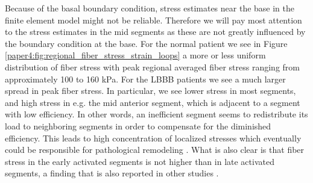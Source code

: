 Because of the basal boundary condition, stress estimates near the
base in the finite element model might not be reliable. Therefore we
will pay most attention to the stress 
estimates in the mid segments as these are not greatly influenced by
the boundary condition at the base. For the normal patient we see in
Figure \ref{paper4:fig:regional_fiber_stress_strain_loops} a
more or less uniform distribution of fiber stress with peak regional
averaged fiber
stress ranging from approximately 100 to 160 kPa. For the LBBB
patients we see a much larger spread in peak fiber stress. In
particular, we see lower stress in most segments, and high stress
in e.g. the mid anterior segment, which is adjacent to a segment with
low efficiency. In other words, an inefficient segment seems to
redistribute its load to neighboring segments in order to compensate
for the diminished efficiency. This leads to high concentration of
localized stresses which eventually could be responsible for pathological remodeling
\cite{grossman1975wall}. What is also clear is that fiber stress in the
early activated segments is not higher than in late activated
segments, a finding that is also reported in other studies
\cite{delhaas1994regional}. 






